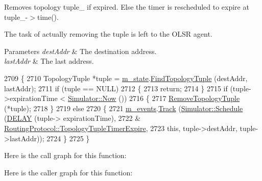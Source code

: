 Removes topology tuple\+\_\+ if expired. Else the timer is rescheduled to expire at tuple\+\_\+-\/$>$time(). 

The task of actually removing the tuple is left to the O\+L\+SR agent.


\begin{DoxyParams}{Parameters}
{\em dest\+Addr} & The destination address. \\
\hline
{\em last\+Addr} & The last address. \\
\hline
\end{DoxyParams}

\begin{DoxyCode}
2709 \{
2710   TopologyTuple *tuple = \hyperlink{classns3_1_1olsr_1_1RoutingProtocol_a07942ec1a7df71b609c8d2ff3b567c49}{m\_state}.\hyperlink{classns3_1_1olsr_1_1OlsrState_a9f2882a2443c4bbcaeea3e92d178b960}{FindTopologyTuple} (destAddr, lastAddr);
2711   \textcolor{keywordflow}{if} (tuple == NULL)
2712     \{
2713       \textcolor{keywordflow}{return};
2714     \}
2715   \textcolor{keywordflow}{if} (tuple->expirationTime < \hyperlink{classns3_1_1Simulator_ac3178fa975b419f7875e7105be122800}{Simulator::Now} ())
2716     \{
2717       \hyperlink{classns3_1_1olsr_1_1RoutingProtocol_a496a7619f3c2de003aebd7554eba2e6e}{RemoveTopologyTuple} (*tuple);
2718     \}
2719   \textcolor{keywordflow}{else}
2720     \{
2721       \hyperlink{classns3_1_1olsr_1_1RoutingProtocol_a80368d3da46150cf3fc9139c40f33d53}{m\_events}.\hyperlink{classns3_1_1EventGarbageCollector_a4f26a1f6e9a09e648eb31b46acd85144}{Track} (\hyperlink{classns3_1_1Simulator_a671882c894a08af4a5e91181bf1eec13}{Simulator::Schedule} (\hyperlink{olsr-routing-protocol_8cc_ad0a00c3386c4a24278b3b710ae798220}{DELAY} (tuple->
      expirationTime),
2722                                            &
      \hyperlink{classns3_1_1olsr_1_1RoutingProtocol_a9200f9b5d45ca2eacf92027ca0355182}{RoutingProtocol::TopologyTupleTimerExpire},
2723                                            \textcolor{keyword}{this}, tuple->destAddr, tuple->lastAddr));
2724     \}
2725 \}
\end{DoxyCode}


Here is the call graph for this function\+:




Here is the caller graph for this function\+:


